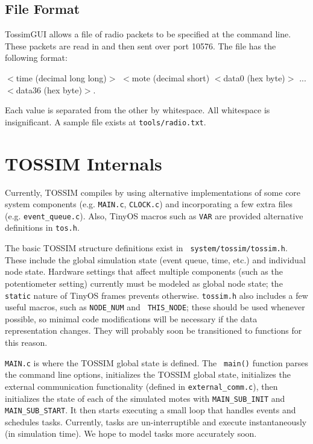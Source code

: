 \documentclass[12pt]{article}
\begin{document}
\subsection*{File Format}

TossimGUI allows a file of radio packets to be specified at the
command line. These packets are read in and then sent over port
10576. The file has the following format:

\vspace{0.1in}
$<$time (decimal long long)$>$ $<$mote (decimal short) $<$data0 (hex byte)$>$ ... $<$data36 (hex byte)$>$.
\vspace{0.1in}

Each value is separated from the other by whitespace. All whitespace
is insignificant. A sample file exists at {\tt tools/radio.txt}.

\section*{TOSSIM Internals}

Currently, TOSSIM compiles by using alternative implementations of
some core system components (e.g. {\tt MAIN.c}, {\tt CLOCK.c}) and
incorporating a few extra files (e.g. {\tt event\_queue.c}). Also,
TinyOS macros such as {\tt VAR} are provided alternative definitions
in {\tt tos.h}.

The basic TOSSIM structure definitions exist in {\tt
system/tossim/tossim.h}. These include the global simulation state
(event queue, time, etc.) and individual node state. Hardware settings
that affect multiple components (such as the potentiometer setting)
currently must be modeled as global node state; the {\tt static}
nature of TinyOS frames prevents otherwise. {\tt tossim.h} also
includes a few useful macros, such as {\tt NODE\_NUM} and {\tt
THIS\_NODE}; these should be used whenever possible, so minimal code
modifications will be necessary if the data representation
changes. They will probably soon be transitioned to functions for this
reason.

{\tt MAIN.c} is where the TOSSIM global state is defined. The {\tt
main()} function parses the command line options, initializes the
TOSSIM global state, initializes the external communication
functionality (defined in {\tt external\_comm.c}), then initializes the
state of each of the simulated motes with {\tt MAIN\_SUB\_INIT} and {\tt
MAIN\_SUB\_START}. It then starts executing a small loop that handles
events and schedules tasks. Currently, tasks are un-interruptible and
execute instantaneously (in simulation time). We hope to model tasks
more accurately soon.
\end{document}
